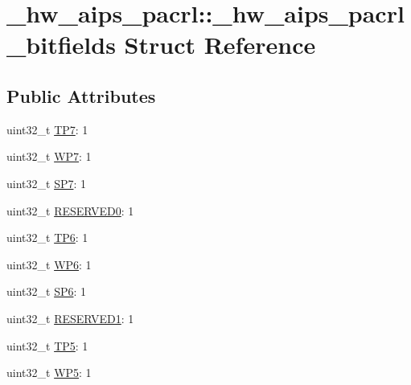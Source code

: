 \hypertarget{struct__hw__aips__pacrl_1_1__hw__aips__pacrl__bitfields}{}\section{\+\_\+hw\+\_\+aips\+\_\+pacrl\+:\+:\+\_\+hw\+\_\+aips\+\_\+pacrl\+\_\+bitfields Struct Reference}
\label{struct__hw__aips__pacrl_1_1__hw__aips__pacrl__bitfields}
\subsection*{Public Attributes}
\begin{DoxyCompactItemize}
\item 
uint32\+\_\+t \hyperlink{struct__hw__aips__pacrl_1_1__hw__aips__pacrl__bitfields_ab1ccced1fde075ef866f14de6cf856ef}{T\+P7}\+: 1
\item 
uint32\+\_\+t \hyperlink{struct__hw__aips__pacrl_1_1__hw__aips__pacrl__bitfields_af476842cedc5f2fbe40c02b044f4c68b}{W\+P7}\+: 1
\item 
uint32\+\_\+t \hyperlink{struct__hw__aips__pacrl_1_1__hw__aips__pacrl__bitfields_a6c7437ee7694c25a9b49b37912dc38a7}{S\+P7}\+: 1
\item 
uint32\+\_\+t \hyperlink{struct__hw__aips__pacrl_1_1__hw__aips__pacrl__bitfields_acaec40d9d4a1e23d1c9abf1beb367aa7}{R\+E\+S\+E\+R\+V\+E\+D0}\+: 1
\item 
uint32\+\_\+t \hyperlink{struct__hw__aips__pacrl_1_1__hw__aips__pacrl__bitfields_a49014f43987cc2626fb508d98d11c115}{T\+P6}\+: 1
\item 
uint32\+\_\+t \hyperlink{struct__hw__aips__pacrl_1_1__hw__aips__pacrl__bitfields_a8fe0d3d97d8bf8660e740d8977e90fbb}{W\+P6}\+: 1
\item 
uint32\+\_\+t \hyperlink{struct__hw__aips__pacrl_1_1__hw__aips__pacrl__bitfields_abc960325df9b1743ae7d77330e8d151e}{S\+P6}\+: 1
\item 
uint32\+\_\+t \hyperlink{struct__hw__aips__pacrl_1_1__hw__aips__pacrl__bitfields_a94f8c61c0bb0f8e9ba3592975a731691}{R\+E\+S\+E\+R\+V\+E\+D1}\+: 1
\item 
uint32\+\_\+t \hyperlink{struct__hw__aips__pacrl_1_1__hw__aips__pacrl__bitfields_ac7ed0df1d03405cfa759f45c2c61ee3d}{T\+P5}\+: 1
\item 
uint32\+\_\+t \hyperlink{struct__hw__aips__pacrl_1_1__hw__aips__pacrl__bitfields_aef29ad19f75b57e9339304c81101080c}{W\+P5}\+: 1

\end{DoxyCompactItemize}
